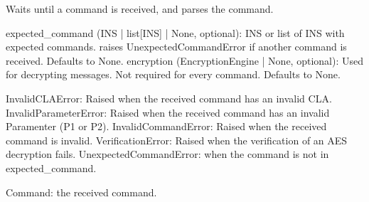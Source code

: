\documentclass[letterpaper,10pt,english]{sphinxmanual}
\begin{document}
\begin{fulllineitems}
\begin{fulllineitems}
\label{\detokenize{aliro_actuator.access_protocol.user_device:aliro_actuator.access_protocol.user_device.UserDevice.wait_for_command}}
\pysigstartsignatures
{}
\pysigstopsignatures
\sphinxAtStartPar
Waits until a command is received, and parses the command.
\begin{description}
\sphinxAtStartPar
expected\_command (INS | list{[}INS{]} | None, optional): INS or list of INS with
expected commands. raises UnexpectedCommandError if another command is received. Defaults to None.
encryption (EncryptionEngine | None, optional): Used for decrypting messages.
Not required for every command. Defaults to None.

\sphinxAtStartPar
InvalidCLAError: Raised when the received command has an invalid CLA.
InvalidParameterError: Raised when the received command has an invalid Paramenter (P1 or P2).
InvalidCommandError: Raised when the received command is invalid.
VerificationError: Raised when the verification of an AES decryption fails.
UnexpectedCommandError: when the command is not in expected\_command.

\sphinxAtStartPar
Command: the received command.

\end{description}

\end{fulllineitems}


\end{fulllineitems}
\end{document}
